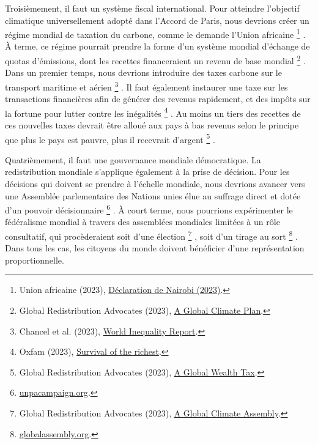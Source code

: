 \documentclass[a5paper,french]{memoir}
\begin{document}
Troisièmement, il faut un système fiscal international. Pour atteindre l'objectif climatique universellement adopté dans l'Accord de Paris, nous devrions créer un régime mondial de taxation du carbone, comme le demande l'Union africaine
\footnote{Union africaine (2023), \href{https://media.africaclimatesummit.org/NAIROBI+Declaration+FURTHER+edited+060923+EN+920AM.pdf}{Déclaration de Nairobi (2023)}.}%
.  À terme, ce régime pourrait prendre la forme d'un système mondial d'échange de quotas d'émissions, dont les recettes financeraient un revenu de base mondial
\footnote{Global Redistribution Advocates (2023), \href{https://github.com/bixiou/global\_tax\_attitudes/raw/main/paper/policy\_brief\_GCS.pdf}{A Global Climate Plan}.}%
. Dans un premier temps, nous devrions introduire des taxes carbone sur le transport maritime et aérien
\footnote{Chancel et al. (2023), \href{https://wid.world/wp-content/uploads/2023/01/CBV2023-ClimateInequalityReport-3.pdf}{World Inequality Report}.}%
. Il faut également instaurer une taxe sur les transactions financières afin de générer des revenus rapidement, et des impôts sur la fortune pour lutter contre les inégalités
\footnote{Oxfam (2023), \href{https://oxfamilibrary.openrepository.com/bitstream/handle/10546/621477/mn-survival-of-the-richest-methodology-160123-en.pdf}{Survival of the richest}.}%
. Au moins un tiers des recettes de ces nouvelles taxes devrait être alloué aux pays à bas revenus selon le principe que plus le pays est pauvre, plus il recevrait d'argent
\footnote{Global Redistribution Advocates (2023), \href{https://github.com/bixiou/global\_tax\_attitudes/raw/main/paper/policy\_brief\_tax.pdf}{A Global Wealth Tax}.}%
.

Quatrièmement, il faut une gouvernance mondiale démocratique. La redistribution mondiale s'applique également à la prise de décision. Pour les décisions qui doivent se prendre à l'échelle mondiale, nous devrions avancer vers une Assemblée parlementaire des Nations unies élue au suffrage direct et dotée d'un pouvoir décisionnaire
\footnote{\href{https://www.unpacampaign.org/}{unpacampaign.org}.}%
. À court terme, nous pourrions expérimenter le fédéralisme mondial à travers des assemblées mondiales limitées à un rôle consultatif, qui procèderaient soit d'une élection
\footnote{Global Redistribution Advocates (2023), \href{https://github.com/bixiou/global\_tax\_attitudes/raw/main/paper/policy\_brief\_assembly.pdf}{A Global Climate Assembly}.}%
, soit d'un tirage au sort
\footnote{\href{https://globalassembly.org/}{globalassembly.org}.}%
. Dans tous les cas, les citoyens du monde doivent bénéficier d'une représentation proportionnelle.
\end{document}
